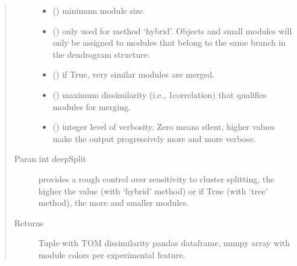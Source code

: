 \documentclass[letterpaper,10pt,english]{sphinxmanual}
\begin{document}
\begin{fulllineitems}
\begin{quote}
\begin{description}
\begin{itemize}
\item {} 
 () \textendash{} minimum module size.

\item {} 
 () \textendash{} only used for method ‘hybrid’. Objects and small modules will only be assigned to modules that belong to the same branch in the dendrogram structure.

\item {} 
 () \textendash{} if True, very similar modules are merged.

\item {} 
 () \textendash{} maximum dissimilarity (i.e., 1\sphinxhyphen{}correlation) that qualifies modules for merging.

\item {} 
 () \textendash{} integer level of verbosity. Zero means silent, higher values make the output progressively more and more verbose.

\end{itemize}

\item[{Paran int deepSplit}] \leavevmode
provides a rough control over sensitivity to cluster splitting, the higher the value (with ‘hybrid’ method) or if True (with ‘tree’ method), the more and smaller modules.

\item[{Returns}] \leavevmode
Tuple with TOM dissimilarity pandas dataframe, numpy array with module colors per experimental feature.

\end{description}\end{quote}

\end{fulllineitems}
\end{document}
